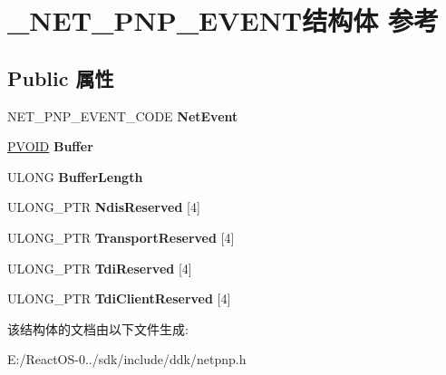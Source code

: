 \hypertarget{struct___n_e_t___p_n_p___e_v_e_n_t}{}\section{\+\_\+\+N\+E\+T\+\_\+\+P\+N\+P\+\_\+\+E\+V\+E\+N\+T结构体 参考}
\label{struct___n_e_t___p_n_p___e_v_e_n_t}
\subsection*{Public 属性}
\begin{DoxyCompactItemize}
\item 
\mbox{\label{struct___n_e_t___p_n_p___e_v_e_n_t_aaee94c757ebebb41583980ca2ec83d15}} 
N\+E\+T\+\_\+\+P\+N\+P\+\_\+\+E\+V\+E\+N\+T\+\_\+\+C\+O\+DE {\bfseries Net\+Event}
\item 
\mbox{\label{struct___n_e_t___p_n_p___e_v_e_n_t_a65057e7c105e4917b1135562a269a668}} 
\hyperlink{interfacevoid}{P\+V\+O\+ID} {\bfseries Buffer}
\item 
\mbox{\label{struct___n_e_t___p_n_p___e_v_e_n_t_a0cd0a99d5913da91afa1f28f48085335}} 
U\+L\+O\+NG {\bfseries Buffer\+Length}
\item 
\mbox{\label{struct___n_e_t___p_n_p___e_v_e_n_t_a286f87abb43ee985ae28558c217220db}} 
U\+L\+O\+N\+G\+\_\+\+P\+TR {\bfseries Ndis\+Reserved} \mbox{[}4\mbox{]}
\item 
\mbox{\label{struct___n_e_t___p_n_p___e_v_e_n_t_a517df2e700578cfb9fab2d0672ce80db}} 
U\+L\+O\+N\+G\+\_\+\+P\+TR {\bfseries Transport\+Reserved} \mbox{[}4\mbox{]}
\item 
\mbox{\label{struct___n_e_t___p_n_p___e_v_e_n_t_a6fe0551c60a8f490629ae149966269dc}} 
U\+L\+O\+N\+G\+\_\+\+P\+TR {\bfseries Tdi\+Reserved} \mbox{[}4\mbox{]}
\item 
\mbox{\label{struct___n_e_t___p_n_p___e_v_e_n_t_a47c60ddf3473cf4f3ee1a8a70e2a2027}} 
U\+L\+O\+N\+G\+\_\+\+P\+TR {\bfseries Tdi\+Client\+Reserved} \mbox{[}4\mbox{]}
\end{DoxyCompactItemize}


该结构体的文档由以下文件生成\+:\begin{DoxyCompactItemize}
\item 
E\+:/\+React\+O\+S-\/0../sdk/include/ddk/netpnp.\+h\end{DoxyCompactItemize}

